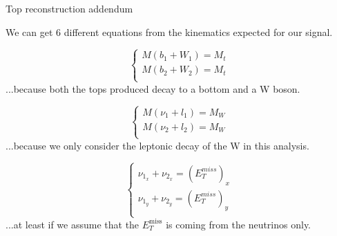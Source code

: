 \documentclass[8 pt]{beamer}
\newcommand{\backupbegin}{
   \newcounter{finalframe}
   \setcounter{finalframe}{\value{framenumber}}
}
\begin{document}
\appendix
	\backupbegin
	
\begin{frame}{Top reconstruction addendum}

   	\justifying
	We can get 6 different equations from the kinematics expected for our signal. \vspace{5pt}
	
	\begin{minipage}[c]{.30\linewidth}
        \begin{equation*}
     	\begin{cases}
		M(b_1 + W_1) = M_t \\
		M(b_2 + W_2) = M_t \\
     	\end{cases}
	\end{equation*}
	\justifying
	...because both the tops produced decay to a bottom and a W boson. \\
   \end{minipage} \hfill
   \hspace{8pt}
   \begin{minipage}[c]{.3\linewidth}
   	\begin{equation*}
     	\begin{cases}
        		M(\nu_1 + l_1) = M_W \\
		M(\nu_2 + l_2) = M_W \\
     	\end{cases}
	\end{equation*}
	\justifying
	...because we only consider the leptonic decay of the W in this analysis. \\
   \end{minipage} \hfill
   \hspace{8pt}
   \begin{minipage}[c]{.3\linewidth}
   	\begin{equation*}
     	\begin{cases}
        		\nu_{1_x} + \nu_{2_x} = (E_T^{miss})_x \\
		\nu_{1_y} + \nu_{2_y} = (E_T^{miss})_y \\
     	\end{cases}
	\end{equation*}
	\justifying
	...at least if we assume that the $E_T^{\text{miss}}$ is coming from the neutrinos only. \\
   \end{minipage} \hfill


\end{frame}
\end{document}
